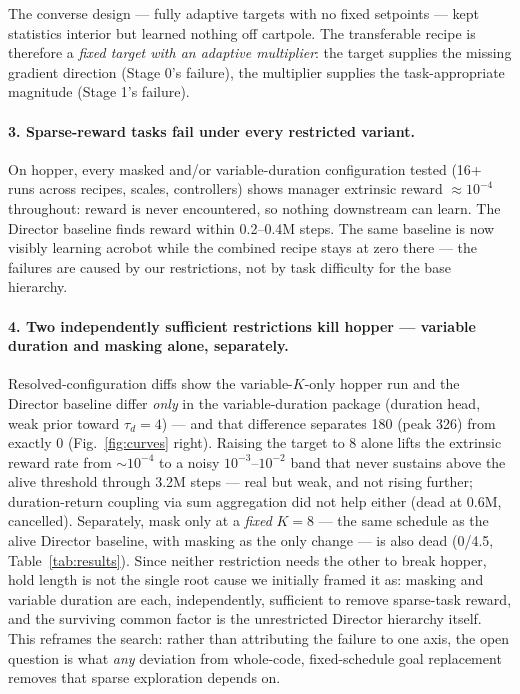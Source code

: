\documentclass[10pt]{article}
\begin{document}
The converse design --- fully adaptive targets with no fixed setpoints ---
kept statistics interior but learned nothing off cartpole. The transferable
recipe is therefore a \emph{fixed target with an adaptive multiplier}:
the target supplies the missing gradient direction (Stage 0's failure), the
multiplier supplies the task-appropriate magnitude (Stage 1's failure).

\paragraph{3. Sparse-reward tasks fail under every restricted variant.}
On hopper, every masked and/or variable-duration configuration tested (16+
runs across recipes, scales, controllers) shows manager extrinsic reward
$\approx 10^{-4}$ throughout: reward is never encountered, so nothing
downstream can learn. The Director baseline finds reward within 0.2--0.4M
steps. The same baseline is now visibly learning acrobot while the combined
recipe stays at zero there --- the failures are caused by our restrictions,
not by task difficulty for the base hierarchy.

\paragraph{4. Two independently sufficient restrictions kill hopper ---
variable duration and masking alone, separately.} Resolved-configuration
diffs show the variable-$K$-only hopper run and the Director baseline differ
\emph{only} in the variable-duration package (duration head, weak prior
toward $\tau_d{=}4$) --- and that difference separates 180 (peak 326) from
exactly 0 (Fig.~\ref{fig:curves} right). Raising the target to 8 alone lifts
the extrinsic reward rate from $\sim10^{-4}$ to a noisy $10^{-3}$--$10^{-2}$
band that never sustains above the alive threshold through 3.2M steps ---
real but weak, and not rising further; duration-return coupling via sum
aggregation did not help either (dead at 0.6M, cancelled). Separately, mask
only at a \emph{fixed} $K{=}8$ --- the same schedule as the alive Director
baseline, with masking as the only change --- is also dead (0/4.5,
Table~\ref{tab:results}). Since neither restriction needs the other to break
hopper, hold length is not the single root cause we initially framed it as:
masking and variable duration are each, independently, sufficient to remove
sparse-task reward, and the surviving common factor is the unrestricted
Director hierarchy itself. This reframes the search: rather than attributing
the failure to one axis, the open question is what \emph{any} deviation from
whole-code, fixed-schedule goal replacement removes that sparse exploration
depends on.
\end{document}
